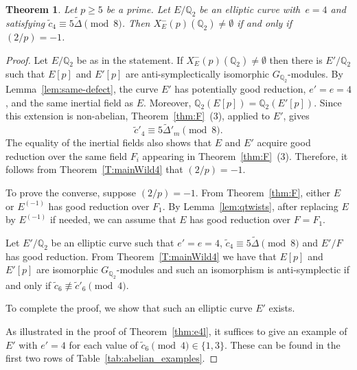 \documentclass[12pt]{amsart}
\numberwithin{equation}{section}
\newtheorem{theorem}[equation]{Theorem}
\theoremstyle{definition}
\newcommand{\Q}{\mathbb{Q}}
\newcommand{\Xp}{X_E^{-}(p)}
\begin{document}
\begin{theorem}\label{thm:e4l2}
	Let $p \geq 5$ be a prime. Let $E/\Q_2$ be an elliptic curve with~$e=4$ and satisfying $\tilde{c}_4 \equiv 5\tilde{\Delta} \pmod 8$.
  Then $\Xp(\Q_2)\neq \emptyset$ if and only if $(2/p) = -1$.
\end{theorem}
\begin{proof}
Let $E/\Q_2$ be as in the statement.
If $\Xp(\Q_2)\neq \emptyset$ then there is $E'/\Q_2$ such that
$E[p]$ and $E'[p]$ are anti-symplectically isomorphic $G_{\Q_2}$-modules. 
By Lemma~\ref{lem:same-defect}, the curve $E'$ has potentially good
reduction, $e'=e=4$, and the same inertial field as $E$. Moreover, $\Q_2(E[p])=\Q_2(E'[p]).$
Since this extension is non-abelian, Theorem~\ref{thm:F}~(3), applied to $E'$,
gives
\[
    \widetilde c'_4\equiv
    5\widetilde\Delta'_m\pmod8.
\]
The equality of the inertial fields also shows that $E$ and $E'$ acquire
good reduction over the same field $F_i$ appearing in
Theorem~\ref{thm:F}~(3). Therefore, it follows from Theorem~\ref{T:mainWild4} that $(2/p)= -1$.

To prove the converse, suppose $(2/p)=-1$.
From Theorem~\ref{thm:F}, either $E$ or $E^{(-1)}$ has good reduction over $F_1$.
By Lemma~\ref{lem:qtwists}, after replacing $E$ by $E^{(-1)}$ if needed, we can assume that $E$ has good reduction over $F = F_1$.

Let $E'/\Q_2$ be an elliptic curve such that $e'=e=4$, $\tilde{c}_4 \equiv 5\tilde{\Delta} \pmod 8$ and $E'/F$ has good reduction.
From Theorem~\ref{T:mainWild4} we have that $E[p]$ and $E'[p]$ are isomorphic $G_{\Q_2}$-modules and
such an isomorphism is anti-symplectic if and only if $\tilde{c}_6 \not\equiv \tilde{c}'_6 \pmod 4$.

To complete the proof, we show that such an elliptic curve $E'$ exists.

As illustrated in the proof of Theorem~\ref{thm:e4l}, it suffices to give an example of $E'$ with $e'=4$ for each value of $\tilde{c}_6 \pmod 4 \in\{1, 3\}$. These can be found in the first two rows
of Table~\ref{tab:abelian_examples}.
\end{proof}
\end{document}
